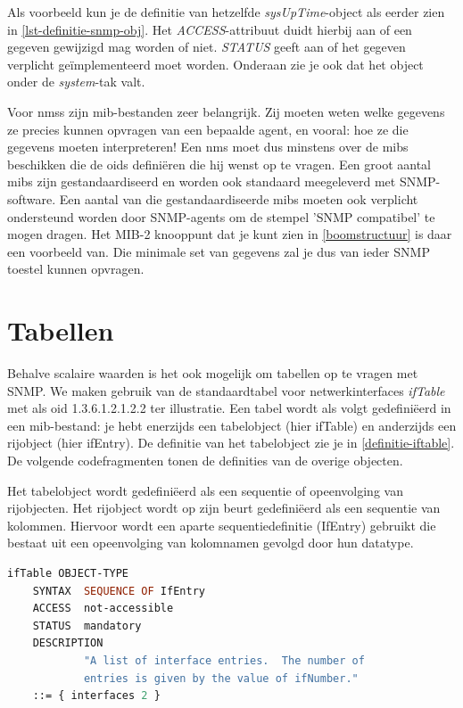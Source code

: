 Als voorbeeld kun je de definitie van hetzelfde \textit{sysUpTime}-object als eerder zien in \cref{lst-definitie-snmp-obj}.
Het \textit{ACCESS}-attribuut duidt hierbij aan of een gegeven gewijzigd mag worden of niet.
\textit{STATUS} geeft aan of het gegeven verplicht geïmplementeerd moet worden.
Onderaan zie je ook dat het object onder de \textit{system}-tak valt.

Voor \glspl{nms} zijn \gls{mib}-bestanden zeer belangrijk.
Zij moeten weten welke gegevens ze precies kunnen opvragen van een bepaalde agent,
en vooral: hoe ze die gegevens moeten interpreteren!
Een \gls{nms} moet dus minstens over de \glspl{mib} beschikken die de \glspl{oid} definiëren die hij wenst op te vragen.
Een groot aantal \glspl{mib} zijn gestandaardiseerd en worden ook standaard meegeleverd met SNMP-software.
Een aantal van die gestandaardiseerde \glspl{mib} moeten ook verplicht ondersteund worden door SNMP-agents om de stempel 'SNMP compatibel' te mogen dragen.
Het MIB-2 knooppunt dat je kunt zien in \cref{boomstructuur} is daar een voorbeeld van.
Die minimale set van gegevens zal je dus van ieder SNMP toestel kunnen opvragen.


\section{Tabellen}
\label{snmp-tabellen}

Behalve scalaire waarden is het ook mogelijk om tabellen op te vragen met SNMP.
We maken gebruik van de standaardtabel voor netwerkinterfaces \emph{ifTable} met als \gls{oid} 1.3.6.1.2.1.2.2 ter illustratie.
Een tabel wordt als volgt gedefiniëerd in een \gls{mib}-bestand: 
je hebt enerzijds een tabelobject (hier ifTable) en anderzijds een rijobject (hier ifEntry).
De definitie van het tabelobject zie je in \cref{definitie-iftable}.
De volgende codefragmenten tonen de definities van de overige objecten. %

Het tabelobject wordt gedefiniëerd als een sequentie of opeenvolging van rijobjecten.
Het rijobject wordt op zijn beurt gedefiniëerd als een sequentie van kolommen.
Hiervoor wordt een aparte sequentiedefinitie (IfEntry) gebruikt die 
bestaat uit een opeenvolging van kolomnamen gevolgd door hun datatype.

\begin{lstlisting}[language=asn.1, float=h, caption={Definitie van een tabel}, label=definitie-iftable]
ifTable OBJECT-TYPE
	SYNTAX	SEQUENCE OF IfEntry
	ACCESS	not-accessible
	STATUS	mandatory
	DESCRIPTION
			"A list of interface entries.  The number of
			entries is given by the value of ifNumber."
	::= { interfaces 2 }
\end{lstlisting}

